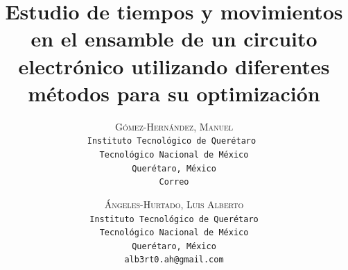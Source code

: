     \lfoot{ \thepage}
    
    \setlength{\droptitle}{-5\baselineskip} %
    \title{\textbf{Estudio de tiempos y movimientos en el ensamble de un circuito electrónico utilizando diferentes métodos para su optimización }} %
    
     \author{ 
     \textsc{Gómez-Hernández, Manuel}\\ 
     \texttt{Instituto Tecnológico de Querétaro } \\ 
     \texttt{Tecnológico Nacional de México} \\ 
     \texttt{Querétaro, México}\\ 
     \texttt{Correo} 
     \and 
     \textsc{Ángeles-Hurtado, Luis Alberto}\\ 
     \texttt{ Instituto Tecnológico de Querétaro } \\ 
     \texttt{ Tecnológico Nacional de México } \\ 
     \texttt{Querétaro, México}\\ 
     \texttt{alb3rt0.ah@gmail.com} 
    }
    
